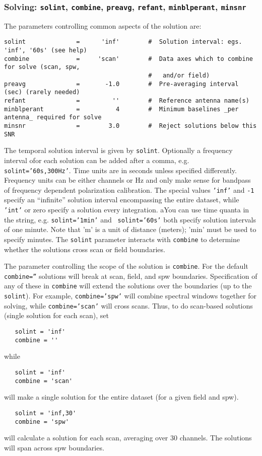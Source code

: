 \subsubsection{Solving: {\tt solint}, {\tt combine},
{\tt preavg}, {\tt refant}, {\tt minblperant}, {\tt minsnr} }
\label{section:cal.solve.pars.solving}

The parameters controlling common aspects of the solution are:
\small
\begin{verbatim}
solint              =      'inf'        #  Solution interval: egs. 'inf', '60s' (see help)
combine             =     'scan'        #  Data axes which to combine for solve (scan, spw,
                                        #   and/or field)
preavg              =       -1.0        #  Pre-averaging interval (sec) (rarely needed)
refant              =         ''        #  Reference antenna name(s)
minblperant         =          4        #  Minimum baselines _per antenna_ required for solve
minsnr              =        3.0        #  Reject solutions below this SNR
\end{verbatim} 
\normalsize

The temporal solution interval is given by {\tt solint}. Optionally a
frequency interval ofor each solution can be added after a comma,
e.g. {\tt solint='60s,300Hz'}. Time units are in seconds unless
specified differently. Frequency units can be either channels or Hz
and only make sense for bandpass of frequency dependent polarization
calibration.  The special values {\tt 'inf'} and {\tt -1} specify an
``infinite'' solution interval encompassing the entire dataset, while
{\tt 'int'} or zero specify a solution every integration.  aYou can
use time quanta in the string, e.g. {\tt solint='1min'} and {\tt
  solint='60s'} both specify solution intervals of one minute.  Note
that 'm' is a unit of distance (meters); 'min' must be used to specify
minutes.  The {\tt solint} parameter interacts with {\tt combine} to
determine whether the solutions cross scan or field boundaries.

The parameter controlling the scope of the solution is {\tt combine}.
For the default {\tt combine=''} solutions will break at scan, field, and spw
boundaries.  Specification of any of these in {\tt combine} will
extend the solutions over the boundaries (up to the {\tt solint}). 
For example, {\tt combine='spw'} will combine spectral windows
together for solving, while {\tt combine='scan'} will cross scans.  
Thus, to do scan-based solutions (single solution for each scan), set
\small
\begin{verbatim}
   solint = 'inf'
   combine = ''
\end{verbatim} 
\normalsize
while
\small
\begin{verbatim}
   solint = 'inf'
   combine = 'scan'
\end{verbatim} 
\normalsize
will make a single solution for the entire dataset (for a given field
and spw).  
\small
\begin{verbatim}
   solint = 'inf,30'
   combine = 'spw'
\end{verbatim}
will calculate a solution for each scan, averaging over 30
channels. The solutions will span across spw boundaries. 

